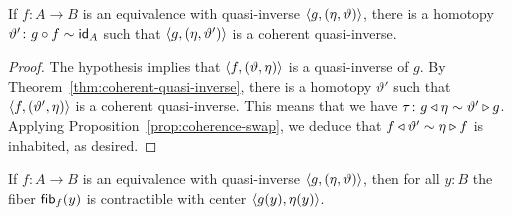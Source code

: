 \begin{cor}\label{cor:coherent-quasi-inverse-2}
    If\/ $f\colon A\to B$ is an equivalence with quasi-inverse\/ $\langle g,(\eta,\vartheta)\rangle$, there is a homotopy\/ $\vartheta'\colon g\circ f\sim\id_A$ such that\/ $\langle g,(\eta,\vartheta')\rangle$ is a coherent quasi-inverse.
\end{cor}

\begin{proof}
    The hypothesis implies that $\langle f,(\vartheta,\eta)\rangle$ is a quasi-inverse of $g$.
    By Theorem~\ref{thm:coherent-quasi-inverse}, there is a homotopy $\vartheta'$ such that $\langle f,(\vartheta',\eta)\rangle$ is a coherent quasi-inverse.
    This means that we have $\tau\colon g\lwct\eta\sim\vartheta'\rwct g$. Applying Proposition~\ref{prop:coherence-swap}, we deduce that $f\triangleleft\vartheta'\sim\eta\triangleright f$ is inhabited, as desired.
\end{proof}

\begin{thm}\label{thm:equivalence-fibers-are-contractible}
    If\/ $f\colon A\to B$ is an equivalence with quasi-inverse\/ $\langle g,(\eta,\vartheta)\rangle$, then for all\/ $y\colon B$ the fiber\/ $\mathsf{fib}_f(y)$ is contractible with center\/ $\langle g(y),\eta(y)\rangle$.
\end{thm}

